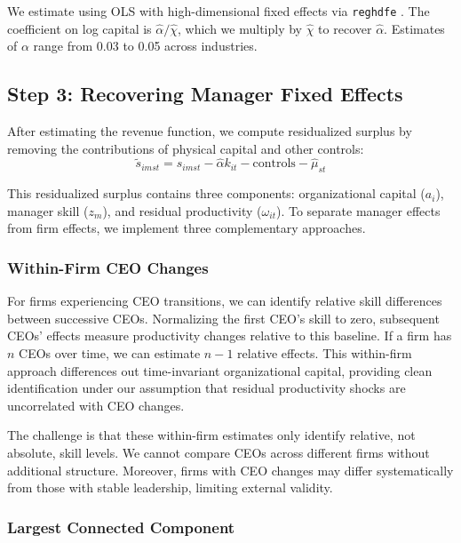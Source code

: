\documentclass[11pt,a4paper]{article}
\begin{document}
We estimate using OLS with high-dimensional fixed effects via \texttt{reghdfe} \citep{reghdfe}. The coefficient on log capital is $\hat{\alpha}/\hat{\chi}$, which we multiply by $\hat{\chi}$ to recover $\hat{\alpha}$. Estimates of $\alpha$ range from 0.03 to 0.05 across industries.

\subsection{Step 3: Recovering Manager Fixed Effects}

After estimating the revenue function, we compute residualized surplus by removing the contributions of physical capital and other controls:
\begin{equation}
\tilde{s}_{imst} = s_{imst} - \hat{\alpha} k_{it} - \text{controls} - \hat{\mu}_{st}
\end{equation}

This residualized surplus contains three components: organizational capital ($a_i$), manager skill ($z_m$), and residual productivity ($\omega_{it}$). To separate manager effects from firm effects, we implement three complementary approaches.

\subsubsection{Within-Firm CEO Changes}

For firms experiencing CEO transitions, we can identify relative skill differences between successive CEOs. Normalizing the first CEO's skill to zero, subsequent CEOs' effects measure productivity changes relative to this baseline. If a firm has $n$ CEOs over time, we can estimate $n-1$ relative effects. This within-firm approach differences out time-invariant organizational capital, providing clean identification under our assumption that residual productivity shocks are uncorrelated with CEO changes.

The challenge is that these within-firm estimates only identify relative, not absolute, skill levels. We cannot compare CEOs across different firms without additional structure. Moreover, firms with CEO changes may differ systematically from those with stable leadership, limiting external validity.

\subsubsection{Largest Connected Component}
\end{document}
